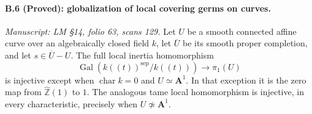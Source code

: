 \paragraph{B.6 (Proved): globalization of local covering germs on curves.}\label{B6}
\textit{Manuscript: LM \S14, folio 63, scans 129.}
Let $U$ be a smooth connected affine curve over an algebraically
closed field $k$, let $\overline U$ be its smooth proper completion,
and let $s\in\overline U-U$. The full local inertia homomorphism
\[
 \operatorname{Gal}(k((t))^{\mathrm{sep}}/k((t)))
 \longrightarrow\pi_1(U)
\]
is injective except when $\operatorname{char}k=0$ and
$U\simeq\mathbf A^1$. In that exception it is the zero map from
$\widehat{\mathbb Z}(1)$ to $1$. The analogous tame local
homomorphism is injective, in every characteristic, precisely when
$U\not\simeq\mathbf A^1$.

